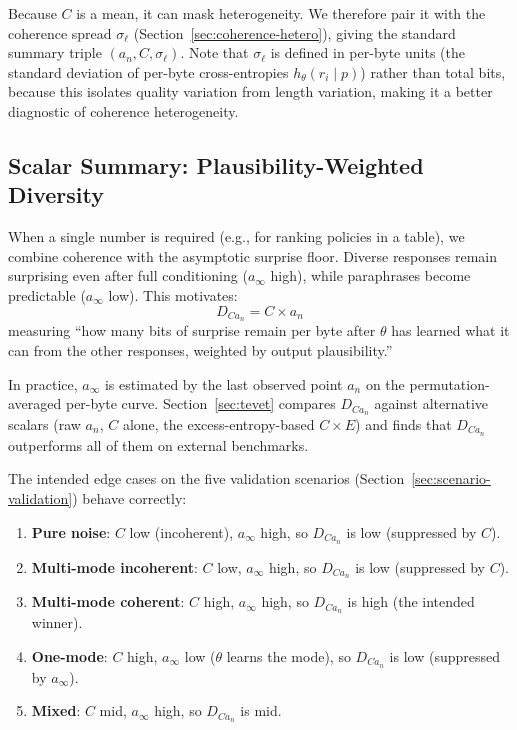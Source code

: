 Because $C$ is a mean, it can mask heterogeneity.
We therefore pair it with the coherence spread $\sigma_\ell$ (Section~\ref{sec:coherence-hetero}), giving the standard summary triple $(a_n, C, \sigma_\ell)$.
Note that $\sigma_\ell$ is defined in per-byte units (the standard deviation of per-byte cross-entropies $h_\theta(r_i \mid p)$) rather than total bits, because this isolates quality variation from length variation, making it a better diagnostic of coherence heterogeneity.

\subsection{Scalar Summary: Plausibility-Weighted Diversity}\label{sec:scalar}

When a single number is required (e.g., for ranking policies in a table), we combine coherence with the asymptotic surprise floor.
Diverse responses remain surprising even after full conditioning ($a_\infty$ high), while paraphrases become predictable ($a_\infty$ low).
This motivates:
\begin{equation}\label{eq:D-ainf}
    D_{Ca_n} = C \times a_n
\end{equation}
measuring ``how many bits of surprise remain per byte after $\theta$ has learned what it can from the other responses, weighted by output plausibility.''

In practice, $a_\infty$ is estimated by the last observed point $a_n$ on the permutation-averaged per-byte curve.
Section~\ref{sec:tevet} compares $D_{Ca_n}$ against alternative scalars (raw $a_n$, $C$ alone, the excess-entropy-based $C \times E$) and finds that $D_{Ca_n}$ outperforms all of them on external benchmarks.

The intended edge cases on the five validation scenarios (Section~\ref{sec:scenario-validation}) behave correctly:
\begin{enumerate}[nosep]
    \item \textbf{Pure noise}: $C$ low (incoherent), $a_\infty$ high, so $D_{Ca_n}$ is low (suppressed by $C$).
    \item \textbf{Multi-mode incoherent}: $C$ low, $a_\infty$ high, so $D_{Ca_n}$ is low (suppressed by $C$).
    \item \textbf{Multi-mode coherent}: $C$ high, $a_\infty$ high, so $D_{Ca_n}$ is high (the intended winner).
    \item \textbf{One-mode}: $C$ high, $a_\infty$ low ($\theta$ learns the mode), so $D_{Ca_n}$ is low (suppressed by $a_\infty$).
    \item \textbf{Mixed}: $C$ mid, $a_\infty$ high, so $D_{Ca_n}$ is mid.
\end{enumerate}

